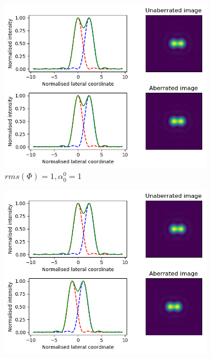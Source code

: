 \begin{figure}
	\centering
	\begin{subfigure}{0.49\textwidth}
		\centering
		\includegraphics[width=\linewidth]{images/Airy_ring_2D_2_object_seperation_aberration_comparison_Noll_1.png}
		\caption{$rms(\Phi) = 1, \alpha_{0}^{0} = 1$}
		\label{fig:Airy_ring_2D_2_object_seperation_aberration_comparison_Noll_1}
	\end{subfigure}
	\begin{subfigure}{0.49\textwidth}
		\centering
		\includegraphics[width=\linewidth]{images/Airy_ring_2D_2_object_seperation_aberration_comparison_Noll_2.png}

\end{subfigure}
\end{figure}
